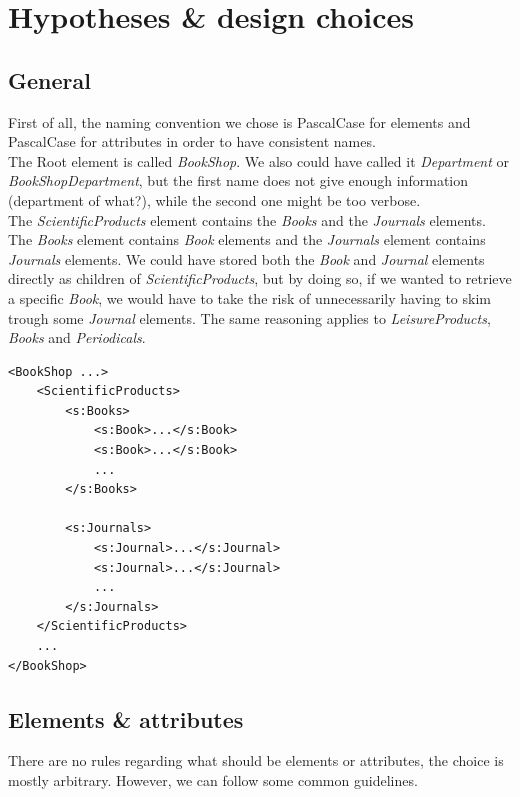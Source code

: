 \section{Hypotheses \& design choices}

\subsection{General}

First of all, the naming convention we chose is PascalCase for elements and
PascalCase for attributes in order to have consistent names.\\

The Root element is called \emph{BookShop}. We also could have called it
\emph{Department} or \emph{BookShopDepartment}, but the first name does not give
enough information (department of what?), while the second one might be too
verbose.\\

The \emph{ScientificProducts} element contains the \emph{Books} and the
\emph{Journals} elements. The \emph{Books} element contains \emph{Book} elements
and the \emph{Journals} element contains \emph{Journals} elements.
We could have stored both the \emph{Book} and \emph{Journal} elements directly
as children of \emph{ScientificProducts}, but by doing so, if we wanted to
retrieve a specific \emph{Book}, we would have to take the risk of unnecessarily
having to skim trough some \emph{Journal} elements.
The same reasoning applies to \emph{LeisureProducts}, \emph{Books} and
\emph{Periodicals}.
\begin{lstlisting}
<BookShop ...>
    <ScientificProducts>
        <s:Books>
            <s:Book>...</s:Book>
            <s:Book>...</s:Book>
            ...
        </s:Books>
        
        <s:Journals>
            <s:Journal>...</s:Journal>
            <s:Journal>...</s:Journal>
            ...
        </s:Journals>
    </ScientificProducts>
    ...
</BookShop>
\end{lstlisting}

\subsection{Elements \& attributes \small{
    \cite{cite:ibmGuidelines} \cite{cite:soAttrElem}
    \cite{cite:ukGovTalkGuidelines}
}}

There are no rules regarding what should be elements or attributes, the choice
is mostly arbitrary. However, we can follow some common guidelines.\\

